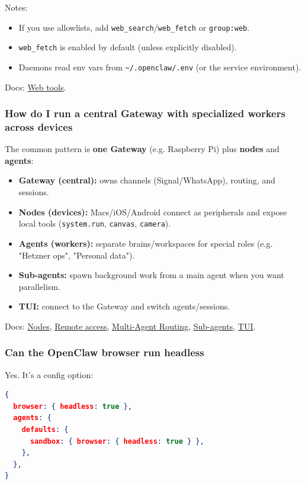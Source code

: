 Notes:

\begin{itemize}
  \item If you use allowlists, add \texttt{web\_search}/\texttt{web\_fetch} or \texttt{group:web}.
  \item \texttt{web\_fetch} is enabled by default (unless explicitly disabled).
  \item Daemons read env vars from \texttt{\textasciitilde{}/.openclaw/.env} (or the service environment).
\end{itemize}


Docs: \href{/tools/web}{Web tools}.

\subsubsection{How do I run a central Gateway with specialized workers across devices}


The common pattern is \textbf{one Gateway} (e.g. Raspberry Pi) plus \textbf{nodes} and \textbf{agents}:

\begin{itemize}
  \item \textbf{Gateway (central):} owns channels (Signal/WhatsApp), routing, and sessions.
  \item \textbf{Nodes (devices):} Macs/iOS/Android connect as peripherals and expose local tools (\texttt{system.run}, \texttt{canvas}, \texttt{camera}).
  \item \textbf{Agents (workers):} separate brains/workspaces for special roles (e.g. "Hetzner ops", "Personal data").
  \item \textbf{Sub-agents:} spawn background work from a main agent when you want parallelism.
  \item \textbf{TUI:} connect to the Gateway and switch agents/sessions.
\end{itemize}


Docs: \href{/nodes}{Nodes}, \href{/gateway/remote}{Remote access}, \href{/concepts/multi-agent}{Multi-Agent Routing}, \href{/tools/subagents}{Sub-agents}, \href{/web/tui}{TUI}.

\subsubsection{Can the OpenClaw browser run headless}


Yes. It's a config option:

\begin{lstlisting}[language=json]
{
  browser: { headless: true },
  agents: {
    defaults: {
      sandbox: { browser: { headless: true } },
    },
  },
}
\end{lstlisting}



